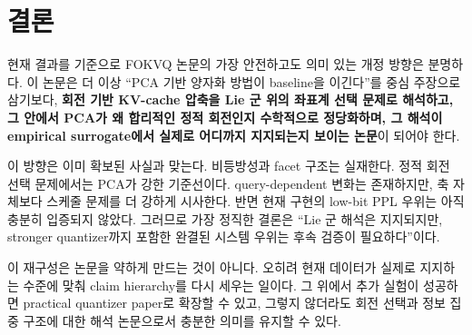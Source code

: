 \section{결론}

현재 결과를 기준으로 FOKVQ 논문의 가장 안전하고도 의미 있는 개정 방향은 분명하다. 이 논문은 더 이상 ``PCA 기반 양자화 방법이 baseline을 이긴다''를 중심 주장으로 삼기보다, \textbf{회전 기반 KV-cache 압축을 Lie 군 위의 좌표계 선택 문제로 해석하고, 그 안에서 PCA가 왜 합리적인 정적 회전인지 수학적으로 정당화하며, 그 해석이 empirical surrogate에서 실제로 어디까지 지지되는지 보이는 논문}이 되어야 한다.

이 방향은 이미 확보된 사실과 맞는다. 비등방성과 facet 구조는 실재한다. 정적 회전 선택 문제에서는 PCA가 강한 기준선이다. query-dependent 변화는 존재하지만, 축 자체보다 스케줄 문제를 더 강하게 시사한다. 반면 현재 구현의 low-bit PPL 우위는 아직 충분히 입증되지 않았다. 그러므로 가장 정직한 결론은 ``Lie 군 해석은 지지되지만, stronger quantizer까지 포함한 완결된 시스템 우위는 후속 검증이 필요하다''이다.

이 재구성은 논문을 약하게 만드는 것이 아니다. 오히려 현재 데이터가 실제로 지지하는 수준에 맞춰 claim hierarchy를 다시 세우는 일이다. 그 위에서 추가 실험이 성공하면 practical quantizer paper로 확장할 수 있고, 그렇지 않더라도 회전 선택과 정보 집중 구조에 대한 해석 논문으로서 충분한 의미를 유지할 수 있다.
